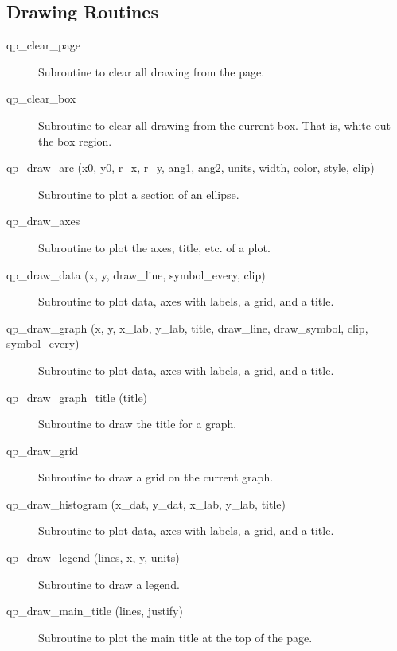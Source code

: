 \subsection{Drawing Routines}

\begin{description}

\item[qp\_clear\_page] \Newline 
     Subroutine to clear all drawing from the page.

\item[qp\_clear\_box] \Newline 
     Subroutine to clear all drawing from the current box.
     That is, white out the box region.

\item[qp\_draw\_arc (x0, y0, r\_x, r\_y, ang1, ang2, 
                     units, width, color, style, clip) ] \Newline 
     Subroutine to plot a section of an ellipse.

\item[qp\_draw\_axes] \Newline 
     Subroutine to plot the axes, title, etc. of a plot.

\item[qp\_draw\_data (x, y, draw\_line, symbol\_every, clip)] \Newline
     Subroutine to plot data, axes with labels, a grid, and a title.

\item[qp\_draw\_graph (x, y, x\_lab, y\_lab, title, 
                  draw\_line, draw\_symbol, clip, symbol\_every) ] \Newline 
     Subroutine to plot data, axes with labels, a grid, and a title.

\item[qp\_draw\_graph\_title (title)] \Newline 
     Subroutine to draw the title for a graph.

\item[qp\_draw\_grid] \Newline 
     Subroutine to draw a grid on the current graph.

\item[qp\_draw\_histogram (x\_dat, y\_dat, x\_lab, y\_lab, title)] \Newline 
     Subroutine to plot data, axes with labels, a grid, and a title.

\item[qp\_draw\_legend (lines, x, y, units)] \Newline 
     Subroutine to draw a legend.

\item[qp\_draw\_main\_title (lines, justify)] \Newline 
     Subroutine to plot the main title at the top of the page.


\end{description}
